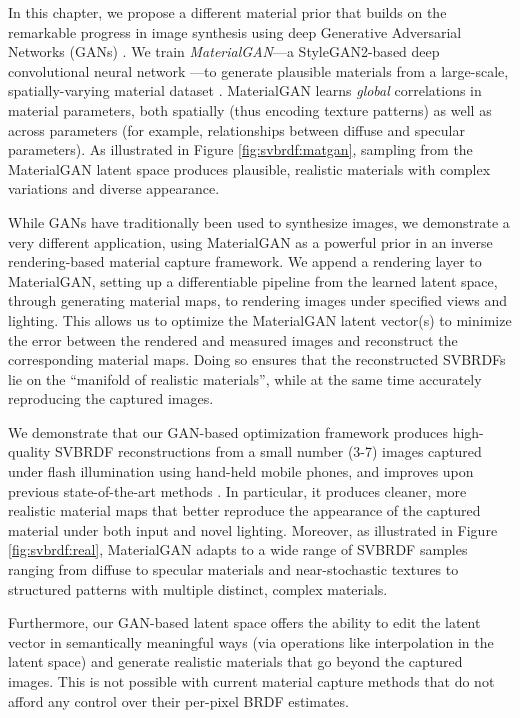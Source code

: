 In this chapter, we propose a different material prior that builds on the remarkable progress in image synthesis using deep Generative Adversarial Networks (GANs) \cite{goodfellow2014generative,karras2018progressive,karras2019style}.
We train \emph{MaterialGAN}---a StyleGAN2-based deep convolutional neural network \cite{karras2020analyzing}---to generate plausible materials from a large-scale, spatially-varying material dataset \cite{deschaintre2018single}.
MaterialGAN learns \emph{global} correlations in material parameters, both spatially (thus encoding texture patterns) as well as across parameters (for example, relationships between diffuse and specular parameters).
As illustrated in Figure \ref{fig:svbrdf:matgan}, sampling from the MaterialGAN latent space produces plausible, realistic materials with complex variations and diverse appearance.



While GANs have traditionally been used to synthesize images, we demonstrate a very different application, using MaterialGAN as a powerful prior in an inverse rendering-based material capture framework.
We append a rendering layer to MaterialGAN, setting up a differentiable pipeline from the learned latent space, through generating material maps, to rendering images under specified views and lighting.
This allows us to optimize the MaterialGAN latent vector(s) to minimize the error between the rendered and measured images and reconstruct the corresponding material maps.
Doing so ensures that the reconstructed SVBRDFs lie on the ``manifold of realistic materials'', while at the same time accurately reproducing the captured images.

We demonstrate that our GAN-based optimization framework produces high-quality SVBRDF reconstructions from a small number (3-7) images captured under flash illumination using hand-held mobile phones, and improves upon previous state-of-the-art methods \cite{gao2019deep,deschaintre2019flexible}.
In particular, it produces cleaner, more realistic material maps that better reproduce the appearance of the captured material under both input and novel lighting.
Moreover, as illustrated in Figure \ref{fig:svbrdf:real}, MaterialGAN adapts to a wide range of SVBRDF samples ranging from diffuse to specular materials and near-stochastic textures to structured patterns with multiple distinct, complex materials.

Furthermore, our GAN-based latent space offers the ability to edit the latent vector in semantically meaningful ways (via operations like interpolation in the latent space) and generate realistic materials that go beyond the captured images.
This is not possible with current material capture methods that do not afford any control over their per-pixel BRDF estimates.

